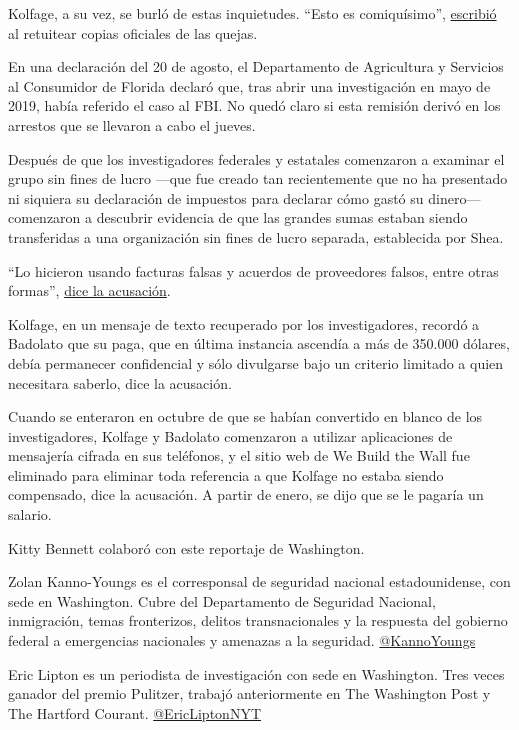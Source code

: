 Kolfage, a su vez, se burló de estas inquietudes. ``Esto es
comiquísimo'',
\href{https://twitter.com/BrianKolfage/status/1158957245612417029}{escribió}
al retuitear copias oficiales de las quejas.

En una declaración del 20 de agosto, el Departamento de Agricultura y
Servicios al Consumidor de Florida declaró que, tras abrir una
investigación en mayo de 2019, había referido el caso al FBI. No quedó
claro si esta remisión derivó en los arrestos que se llevaron a cabo el
jueves.

Después de que los investigadores federales y estatales comenzaron a
examinar el grupo sin fines de lucro ---que fue creado tan recientemente
que no ha presentado ni siquiera su declaración de impuestos para
declarar cómo gastó su dinero--- comenzaron a descubrir evidencia de que
las grandes sumas estaban siendo transferidas a una organización sin
fines de lucro separada, establecida por Shea.

``Lo hicieron usando facturas falsas y acuerdos de proveedores falsos,
entre otras formas'',
\href{https://int.graylady3jvrrxbe.onion/data/documenttools/u-s-v-brian-kolfage-stephen-bannon-et-al/e56f197b430d0fcb/full.pdf}{dice
la acusación}.

Kolfage, en un mensaje de texto recuperado por los investigadores,
recordó a Badolato que su paga, que en última instancia ascendía a más
de 350.000 dólares, debía permanecer confidencial y sólo divulgarse bajo
un criterio limitado a quien necesitara saberlo, dice la acusación.

Cuando se enteraron en octubre de que se habían convertido en blanco de
los investigadores, Kolfage y Badolato comenzaron a utilizar
aplicaciones de mensajería cifrada en sus teléfonos, y el sitio web de
We Build the Wall fue eliminado para eliminar toda referencia a que
Kolfage no estaba siendo compensado, dice la acusación. A partir de
enero, se dijo que se le pagaría un salario.

Kitty Bennett colaboró con este reportaje de Washington.

Zolan Kanno-Youngs es el corresponsal de seguridad nacional
estadounidense, con sede en Washington. Cubre del Departamento de
Seguridad Nacional, inmigración, temas fronterizos, delitos
transnacionales y la respuesta del gobierno federal a emergencias
nacionales y amenazas a la seguridad.
\href{https://twitter.com/KannoYoungs}{@KannoYoungs}

Eric Lipton es un periodista de investigación con sede en Washington.
Tres veces ganador del premio Pulitzer, trabajó anteriormente en The
Washington Post y The Hartford Courant.
\href{https://twitter.com/EricLiptonNYT}{@EricLiptonNYT}

